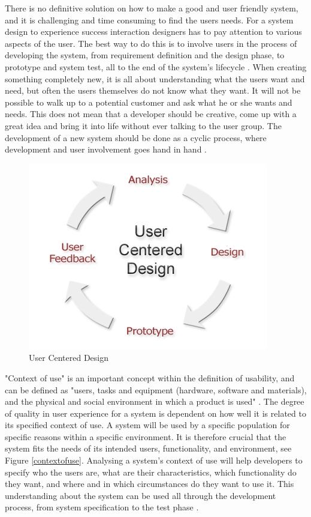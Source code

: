 There is no definitive solution on how to make a good and user friendly system, and it is challenging and time consuming to find the users needs. For a system design to experience success interaction designers has to pay attention to various aspects of the user. The best way to do this is to involve users in the process of developing the system, from requirement definition and the design phase, to prototype and system test, all to the end of the system's lifecycle \cite{mmi}. When creating something completely new, it is all about understanding what the users want and need, but often the users themselves do not know what they want. It will not be possible to walk up to a potential customer and ask what he or she wants and needs. This does not mean that a developer should be creative, come up with a great idea and bring it into life without ever talking to the user group. The development of a new system should be done as a cyclic process, where development and user involvement goes hand in hand \cite{mmi}.  
\begin{figure} [ht!]
\centering
\includegraphics[scale=0.8]{userdesign.jpg}
\caption{User Centered Design \cite{userdesign}}
\label{userdesign}
\end{figure}

"Context of use" is an important concept within the definition of usability, and can be defined as "users, tasks and equipment (hardware, software and materials), and the physical and social environment in which a product is used" \cite{maguire2001context}. The degree of quality in user experience for a system is dependent on how well it is related to its specified context of use. A system will be used by a specific population for specific reasons within a specific environment. It is therefore crucial that the system fits the needs of its intended users, functionality, and environment, see Figure \ref{contextofuse}. Analysing a system's context of use will help developers to specify who the users are, what are their characteristics, which functionality do they want, and where and in which circumstances do they want to use it. This understanding about the system can be used all through the development process, from system specification to the test phase \cite{maguire2001context}.


